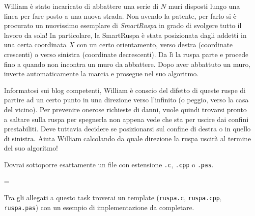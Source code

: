 \usepackage{xcolor}
\usepackage{afterpage}
\usepackage{pifont,mdframed}
\usepackage[bottom]{footmisc}

\makeatletter
\gdef\this@inputfilename{input.txt}
\gdef\this@outputfilename{output.txt}
\makeatother

\newcommand{\inputfile}{\texttt{input.txt}}
\newcommand{\outputfile}{\texttt{output.txt}}

\newenvironment{warning}
  {\par\begin{mdframed}[linewidth=2pt,linecolor=gray]%
    \begin{list}{}{\leftmargin=1cm
                   \labelwidth=\leftmargin}\item[\Large\ding{43}]}
  {\end{list}\end{mdframed}\par}

	William \`e stato incaricato di abbattere una serie di $N$ muri disposti lungo una linea per fare posto a una nuova strada. Non avendo la patente, per farlo si \`e procurato un nuovissimo esemplare di \emph{SmartRuspa} in grado di svolgere tutto il lavoro da sola! In particolare, la SmartRuspa \`e stata posizionata dagli addetti in una certa coordinata $X$ con un certo orientamento, verso destra (coordinate crescenti) o verso sinistra (coordinate decrescenti). Da l\`i la ruspa parte e procede fino a quando non incontra un muro da abbattere. Dopo aver abbattuto un muro, inverte automaticamente la marcia e prosegue nel suo algoritmo.

	Informatosi sui blog competenti, William \`e conscio del difetto di queste ruspe di partire ad un certo punto in una direzione verso l'infinito (o peggio, verso la casa del vicino). Per prevenire onerose richieste di danni, vuole quindi trovarsi pronto a saltare sulla ruspa per spegnerla non appena vede che sta per uscire dai confini prestabiliti. Deve tuttavia decidere se posizionarsi sul confine di destra o in quello di sinistra. Aiuta William calcolando da quale direzione la ruspa uscir\`a al termine del suo algoritmo!

\Implementation
Dovrai sottoporre esattamente un file con estensione \texttt{.c}, \texttt{.cpp} o \texttt{.pas}.

\begin{warning}
Tra gli allegati a questo task troverai un template (\texttt{ruspa.c}, \texttt{ruspa.cpp}, \texttt{ruspa.pas}) con un esempio di implementazione da completare.
\end{warning}

